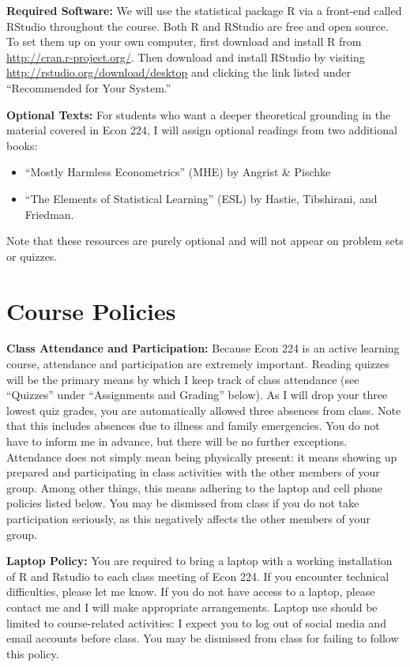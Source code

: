 \documentclass[11pt, letterpaper]{article}
\begin{document}
\noindent \textbf{Required Software:} 
We will use the statistical package R via a front-end called RStudio throughout the course. 
Both R and RStudio are free and open source. 
To set them up on your own computer, first download and install R from \url{http://cran.r-project.org/}. 
Then download and install RStudio by visiting \url{http://rstudio.org/download/desktop} and clicking the link listed under ``Recommended for Your System.'' 


\medskip

\noindent \textbf{Optional Texts:}
For students who want a deeper theoretical grounding in the material covered in Econ 224, I will assign optional readings from two additional books:
\begin{itemize}
  \item ``Mostly Harmless Econometrics'' (MHE) by Angrist \& Pischke
  \item ``The Elements of Statistical Learning'' (ESL) by Hastie, Tibshirani, and Friedman.
\end{itemize}
Note that these resources are purely optional and will not appear on problem sets or quizzes.


\section*{Course Policies}


\noindent \textbf{Class Attendance and Participation:}
Because Econ 224 is an active learning course, attendance and participation are extremely important. 
Reading quizzes will be the primary means by which I keep track of class attendance (see ``Quizzes'' under ``Assignments and Grading'' below).
As I will drop your three lowest quiz grades, you are automatically allowed three absences from class.
Note that this includes absences due to illness and family emergencies.
You do not have to inform me in advance, but there will be no further exceptions.
Attendance does not simply mean being physically present: it means showing up prepared and participating in class activities with the other members of your group.
Among other things, this means adhering to the laptop and cell phone policies listed below.
You may be dismissed from class if you do not take participation seriously, as this negatively affects the other members of your group.

\medskip

\noindent \textbf{Laptop Policy:} You are required to bring a laptop with a working installation of R and Rstudio to each class meeting of Econ 224.
If you encounter technical difficulties, please let me know.
If you do not have access to a laptop, please contact me and I will make appropriate arrangements.
Laptop use should be limited to course-related activities: I expect you to log out of social media and email accounts before class.
You may be dismissed from class for failing to follow this policy.
\end{document}
